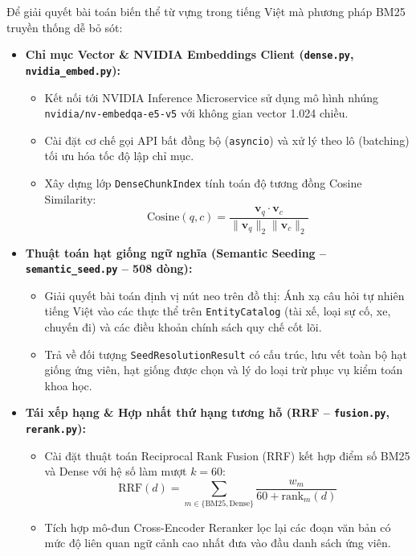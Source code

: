 \documentclass[a4paper,11pt]{article}
\begin{document}
Để giải quyết bài toán biến thể từ vựng trong tiếng Việt mà phương pháp BM25 truyền thống dễ bỏ sót:
\begin{itemize}[leftmargin=1.5em]
    \item \textbf{Chỉ mục Vector \& NVIDIA Embeddings Client (\texttt{dense.py}, \texttt{nvidia\_embed.py}):}
    \begin{itemize}[noitemsep]
        \item Kết nối tới NVIDIA Inference Microservice sử dụng mô hình nhúng \nolinkurl{nvidia/nv-embedqa-e5-v5} với không gian vector 1.024 chiều.
        \item Cài đặt cơ chế gọi API bất đồng bộ (\texttt{asyncio}) và xử lý theo lô (batching) tối ưu hóa tốc độ lập chỉ mục.
        \item Xây dựng lớp \texttt{DenseChunkIndex} tính toán độ tương đồng Cosine Similarity:
        \begin{equation}
            \text{Cosine}(q, c) = \frac{\mathbf{v}_q \cdot \mathbf{v}_c}{\|\mathbf{v}_q\|_2 \|\mathbf{v}_c\|_2}
        \end{equation}
    \end{itemize}
    \item \textbf{Thuật toán hạt giống ngữ nghĩa (Semantic Seeding -- \nolinkurl{semantic_seed.py} -- 508 dòng):}
    \begin{itemize}[noitemsep]
        \item Giải quyết bài toán định vị nút neo trên đồ thị: Ánh xạ câu hỏi tự nhiên tiếng Việt vào các thực thể trên \texttt{EntityCatalog} (tài xế, loại sự cố, xe, chuyến đi) và các điều khoản chính sách quy chế cốt lõi.
        \item Trả về đối tượng \texttt{SeedResolutionResult} có cấu trúc, lưu vết toàn bộ hạt giống ứng viên, hạt giống được chọn và lý do loại trừ phục vụ kiểm toán khoa học.
    \end{itemize}
    \item \textbf{Tái xếp hạng \& Hợp nhất thứ hạng tương hỗ (RRF -- \texttt{fusion.py}, \texttt{rerank.py}):}
    \begin{itemize}[noitemsep]
        \item Cài đặt thuật toán Reciprocal Rank Fusion (RRF) kết hợp điểm số BM25 và Dense với hệ số làm mượt $k=60$:
        \begin{equation}
            \text{RRF}(d) = \sum_{m \in \{\text{BM25}, \text{Dense}\}} \frac{w_m}{60 + \text{rank}_m(d)}
        \end{equation}
        \item Tích hợp mô-đun Cross-Encoder Reranker lọc lại các đoạn văn bản có mức độ liên quan ngữ cảnh cao nhất đưa vào đầu danh sách ứng viên.
    \end{itemize}
\end{itemize}
\end{document}
